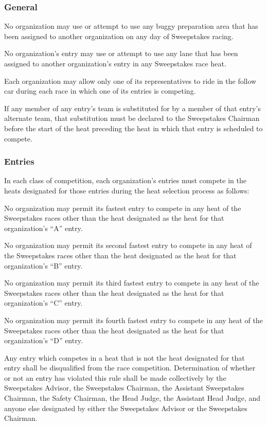 \documentclass[openany]{book}
\begin{document}
\subsubsection{General}

No organization may use or attempt to use any buggy preparation area that has been assigned to another organization on any day of Sweepstakes racing.

No organization's entry may use or attempt to use any lane that has been assigned to another organization's entry in any Sweepstakes race heat.

Each organization may allow only one of its representatives to ride in the follow car during each race in which one of its entries is competing.

If any member of any entry's team is substituted for by a member of that entry's alternate team, that substitution must be declared to the Sweepstakes Chairman before the start of the heat preceding the heat in which that entry is scheduled to compete.

\subsubsection{Entries}

In each class of competition, each organization's entries must compete in the heats designated for those entries during the heat selection process as follows:

No organization may permit its fastest entry to compete in any heat of the Sweepstakes races other than the heat designated as the heat for that organization's ``A'' entry.

No organization may permit its second fastest entry to compete in any heat of the Sweepstakes races other than the heat designated as the heat for that organization's ``B'' entry.

No organization may permit its third fastest entry to compete in any heat of the Sweepstakes races other than the heat designated as the heat for that organization's ``C'' entry.

No organization may permit its fourth fastest entry to compete in any heat of the Sweepstakes races other than the heat designated as the heat for that organization's ``D'' entry.

Any entry which competes in a heat that is not the heat designated for that entry shall be disqualified from the race competition. Determination of whether or not an entry has violated this rule shall be made collectively by the Sweepstakes Advisor, the Sweepstakes Chairman, the Assistant Sweepstakes Chairman, the Safety Chairman, the Head Judge, the Assistant Head Judge, and anyone else designated by either the Sweepstakes Advisor or the Sweepstakes Chairman.
\end{document}

